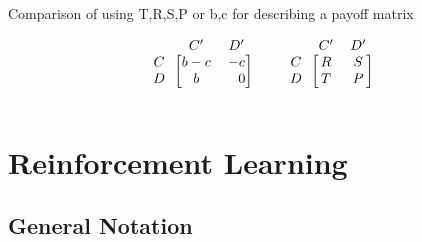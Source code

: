 \documentclass[a4paper,12pt]{scrartcl}
\begin{document}
\begin{equationfloat}[!ht]
	\caption{Comparison of using T,R,S,P or b,c for describing a payoff matrix}
	\begin{equation}
	\begin{blockarray}{ccc}
		& C' & D'  \\
		\begin{block}{c[cc]}
		C & b-c & -c\\
		D & b & \hphantom{-}0 \\
		\end{block}
	\end{blockarray} \qquad
	\begin{blockarray}{ccc}
	& C' & D'  \\
	\begin{block}{c[cc]}
	C & R & S\\
	D & T & P \\
	\end{block}
	\end{blockarray}
	\label{eq:comparison_tsrp_bc}
	\end{equation}
\end{equationfloat}

\filbreak\section{Reinforcement Learning}

\subsection{General Notation}
\end{document}
